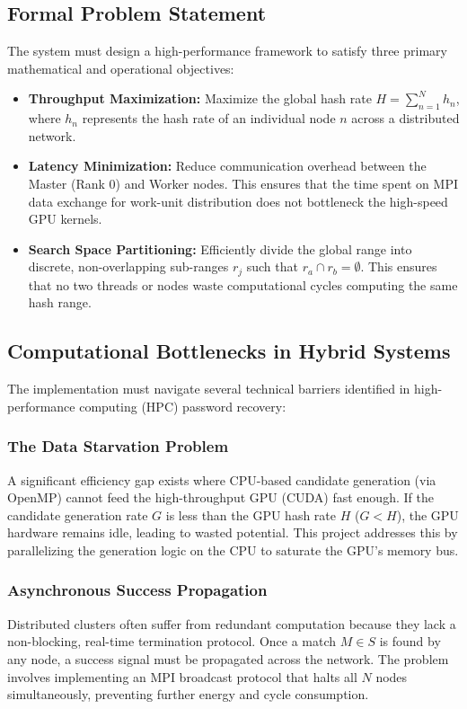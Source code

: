 \documentclass[12pt,a4paper]{article}
\begin{document}
\subsection{Formal Problem Statement}
The system must design a high-performance framework to satisfy three primary mathematical and operational objectives:
\begin{itemize}
    \item \textbf{Throughput Maximization:} Maximize the global hash rate $H = \sum_{n=1}^{N} h_n$, where $h_n$ represents the hash rate of an individual node $n$ across a distributed network.
    \item \textbf{Latency Minimization:} Reduce communication overhead between the Master (Rank 0) and Worker nodes. This ensures that the time spent on MPI data exchange for work-unit distribution does not bottleneck the high-speed GPU kernels.
    \item \textbf{Search Space Partitioning:} Efficiently divide the global range into discrete, non-overlapping sub-ranges $r_j$ such that $r_a \cap r_b = \emptyset$. This ensures that no two threads or nodes waste computational cycles computing the same hash range.
\end{itemize}

\subsection{Computational Bottlenecks in Hybrid Systems}
The implementation must navigate several technical barriers identified in high-performance computing (HPC) password recovery:

\subsubsection{The Data Starvation Problem}
A significant efficiency gap exists where CPU-based candidate generation (via OpenMP) cannot feed the high-throughput GPU (CUDA) fast enough. If the candidate generation rate $G$ is less than the GPU hash rate $H$ ($G < H$), the GPU hardware remains idle, leading to wasted potential. This project addresses this by parallelizing the generation logic on the CPU to saturate the GPU's memory bus.

\subsubsection{Asynchronous Success Propagation}
Distributed clusters often suffer from redundant computation because they lack a non-blocking, real-time termination protocol. Once a match $M \in S$ is found by any node, a success signal must be propagated across the network. The problem involves implementing an MPI broadcast protocol that halts all $N$ nodes simultaneously, preventing further energy and cycle consumption.
\end{document}
